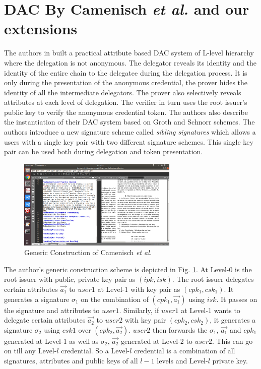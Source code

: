 \documentclass[journal]{IEEEtran}
\begin{document}
\section{DAC By Camenisch \textit{et al.} \cite{CamenischDD17} and our extensions} \label{camen}
The authors in \cite{CamenischDD17} built a practical attribute based DAC system of L-level hierarchy where the delegation is not anonymous. The delegator reveals its identity and the identity of the entire chain to the delegatee during the delegation process. It is only during the presentation of the anonymous credential, the prover hides the identity of all the intermediate delegators. The prover also selectively reveals attributes at each level of delegation. The verifier in turn uses the root issuer's public key to verify the anonymous credential token. The authors also describe the instantiation of their DAC system based on Groth \cite{groth} and Schnorr \cite{rfc8235} schemes. The authors introduce a new signature scheme called \textit{sibling signatures} which allows a users with a single key pair with two different signature schemes. This single key pair can be used both during delegation and token presentation.

\begin{figure}[htbp]
\centerline{\includegraphics[width=3in]{dac.png}}
\caption{Generic Construction of Camenisch \textit{et al.} \cite{CamenischDD17}}
\label{fig:genconst}
\end{figure}

The author's generic construction scheme is depicted in Fig. \ref{fig:genconst}. At Level-0 is the root issuer with public, private key pair as $(ipk,isk)$. The root issuer delegates certain attributes $\overrightarrow{a_1}$ to $user1$ at Level-1 with key pair as $(cpk_1, csk_1)$. It generates a signature $\sigma_1$ on the combination of $(cpk_1,\overrightarrow{a_1})$ using $isk$. It passes on the signature and attributes to  $user1$. Similarly, if $user1$ at Level-1 wants to delegate certain attributes $\overrightarrow{a_2}$ to $user2$ with key pair $(cpk_2, csk_2)$, it generates a signature $\sigma_2$ using $csk1$ over $(cpk_2,\overrightarrow{a_2})$. $user2$ then forwards the $\sigma_1$, $\overrightarrow{a_1}$ and $cpk_1$ generated at Level-1 as well as $\sigma_2$, $\overrightarrow{a_2}$ generated at Level-2 to $user2$. This can go on till any Level-$l$ credential. So a Level-$l$ credential is a combination of all signatures, attributes and public keys of all $l-1$ levels and Level-$l$ private key.
\end{document}
